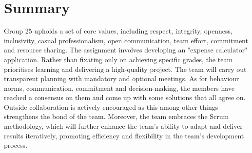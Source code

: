 \documentclass[sigconf,nonacm]{acmart}
\begin{document}
\section{Summary}
Group 25 upholds a set of core values, including respect, integrity, openness, inclusivity, casual professionalism, open communication, team effort, commitment and resource sharing. The assignment involves developing an "expense calculator" application. Rather than fixating only on achieving specific grades, the team prioritises learning and delivering a high-quality project. The team will carry out transparent planning with mandatory and optional meetings. As for behaviour norms, communication, commitment and decision-making, the members have reached a consensus on them and come up with some solutions that all agree on. Outside collaboration is actively encouraged as this among other things strengthens the bond of the team. Moreover, the team embraces the Scrum methodology, which will further enhance the team's ability to adapt and deliver results iteratively, promoting efficiency and flexibility in the team's development process.
\end{document}
